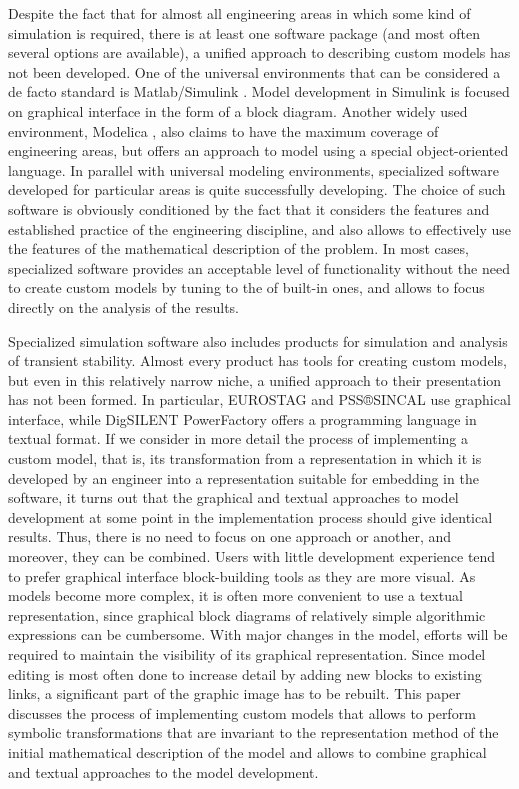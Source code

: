 \documentclass[lettersize,journal]{IEEEtran}
\begin{document}
Despite the fact that for almost all engineering areas in which some kind of simulation is required, there is at least one software package 
(and most often several options are available), a unified approach to describing custom models has not been developed. 
One of the universal environments that can be considered a de facto standard is Matlab/Simulink \cite{sumulink}. Model development in Simulink 
is focused on graphical interface in the form of a block diagram. Another widely used environment, Modelica \cite{modelica}, also claims to have 
the maximum coverage of engineering areas, but offers an approach to model using a special object-oriented language. 
In parallel with universal modeling environments, specialized software developed for particular areas is quite successfully developing. 
The choice of such software is obviously conditioned by the fact that it considers the features and established practice of the engineering discipline, 
and also allows to effectively use the features of the mathematical description of the problem. In most cases, specialized software 
provides an acceptable level of functionality without the need to create custom models by tuning to the  of built-in ones, and allows 
to focus directly on the analysis of the results.

Specialized simulation software also includes products for simulation and analysis of transient stability.
Almost every product has tools for creating custom models, but even in this relatively narrow niche, a unified approach to their presentation 
has not been formed. In particular, EUROSTAG \cite{eurostag} and PSS®SINCAL \cite{sincal} use graphical interface, while DigSILENT 
PowerFactory \cite{powefactory} offers a programming language in textual format.
If we consider in more detail the process of implementing a custom model, that is, its transformation from a representation in which 
it is developed by an engineer into a representation suitable for embedding in the software, it turns out that the graphical and textual approaches 
to model development at some point in the implementation process should give identical results. Thus, there is no need to focus on one approach or another,
and moreover, they can be combined. Users with little development experience tend to prefer graphical interface block-building tools as they are more visual. 
As models become more complex, it is often more convenient to use a textual representation, since graphical block diagrams of relatively simple algorithmic 
expressions can be cumbersome. With major changes in the model, efforts will be required to maintain the visibility of its graphical representation. 
Since model editing is most often done to increase detail by adding new blocks to existing links, a significant part of the graphic image has to be rebuilt.
This paper discusses the process of implementing custom models that allows to perform symbolic transformations that are invariant to the representation method
of the initial mathematical description of the model and allows to combine graphical and textual approaches to the model development.
\end{document}
